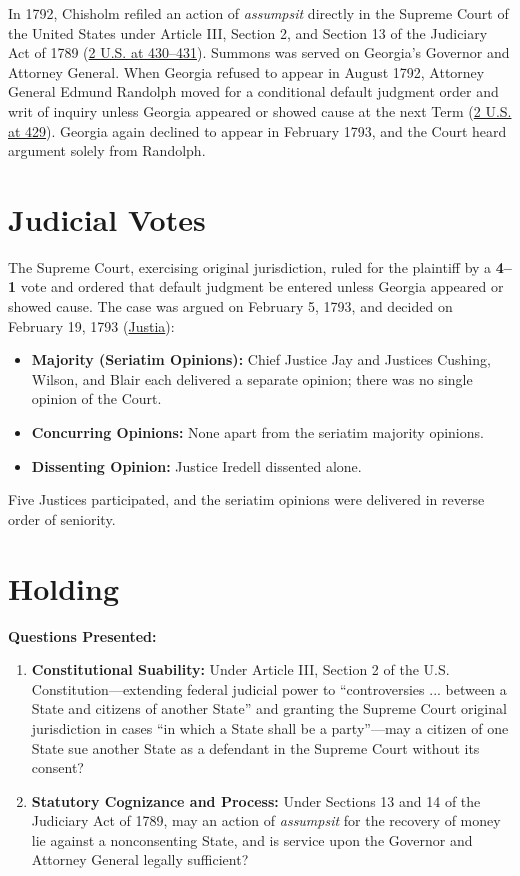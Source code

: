 \documentclass[12pt]{article}
\begin{document}
In 1792, Chisholm refiled an action of \emph{assumpsit} directly in the Supreme Court of the United States under Article III, Section 2, and Section 13 of the Judiciary Act of 1789 (\href{https://supreme.justia.com/cases/federal/us/2/419/}{2 U.S. at 430--431}). Summons was served on Georgia's Governor and Attorney General. When Georgia refused to appear in August 1792, Attorney General Edmund Randolph moved for a conditional default judgment order and writ of inquiry unless Georgia appeared or showed cause at the next Term (\href{https://supreme.justia.com/cases/federal/us/2/419/}{2 U.S. at 429}). Georgia again declined to appear in February 1793, and the Court heard argument solely from Randolph.

\section{Judicial Votes}
The Supreme Court, exercising original jurisdiction, ruled for the plaintiff by a \textbf{4--1} vote and ordered that default judgment be entered unless Georgia appeared or showed cause. The case was argued on February 5, 1793, and decided on February 19, 1793 (\href{https://supreme.justia.com/cases/federal/us/2/419/}{Justia}):

\begin{itemize}
    \item \textbf{Majority (Seriatim Opinions):} Chief Justice Jay and Justices Cushing, Wilson, and Blair each delivered a separate opinion; there was no single opinion of the Court.
    \item \textbf{Concurring Opinions:} None apart from the seriatim majority opinions.
    \item \textbf{Dissenting Opinion:} Justice Iredell dissented alone.
\end{itemize}

Five Justices participated, and the seriatim opinions were delivered in reverse order of seniority.

\section{Holding}
\textbf{Questions Presented:}

\begin{enumerate}
  \item \textbf{Constitutional Suability:} Under Article III, Section 2 of the U.S. Constitution---extending federal judicial power to ``controversies ... between a State and citizens of another State'' and granting the Supreme Court original jurisdiction in cases ``in which a State shall be a party''---may a citizen of one State sue another State as a defendant in the Supreme Court without its consent?
  \item \textbf{Statutory Cognizance and Process:} Under Sections 13 and 14 of the Judiciary Act of 1789, may an action of \emph{assumpsit} for the recovery of money lie against a nonconsenting State, and is service upon the Governor and Attorney General legally sufficient?
\end{enumerate}
\end{document}
